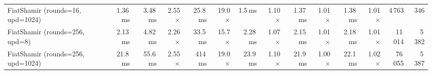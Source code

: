 \begin{table}[htbp]
\begin{adjustbox}{max width=\linewidth}
\begin{tabular}{lrrrrrrrrrrrrr}
FiatShamir (rounds=16, upd=1024) & 1.36\,ms & 3.48\,ms & 2.55$\times$ & 25.8\,ms & 19.0$\times$ & 1.5\,ms & 1.10$\times$ & 1.37\,ms & 1.01$\times$ & 1.38\,ms & 1.01$\times$ & 4\,763 & 346 \\
FiatShamir (rounds=256, upd=8) & 2.13\,ms & 4.82\,ms & 2.26$\times$ & 33.5\,ms & 15.7$\times$ & 2.28\,ms & 1.07$\times$ & 2.15\,ms & 1.01$\times$ & 2.18\,ms & 1.01$\times$ & 11\,014 & 5\,382 \\
FiatShamir (rounds=256, upd=1024) & 21.8\,ms & 55.6\,ms & 2.55$\times$ & 414\,ms & 19.0$\times$ & 23.9\,ms & 1.10$\times$ & 21.9\,ms & 1.00$\times$ & 22.1\,ms & 1.02$\times$ & 76\,055 & 5\,387 \\
\bottomrule
\end{tabular}
\end{adjustbox}
\end{table}
